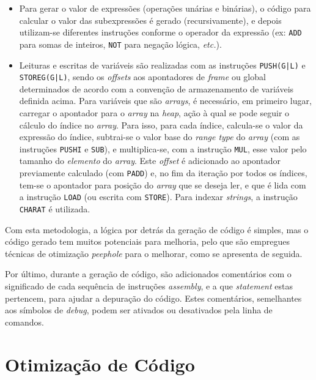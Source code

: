 \documentclass[12pt, a4paper]{article}
\begin{document}
\begin{itemize}
    \item Para gerar o valor de expressões (operações unárias e binárias), o código para calcular o
        valor das subexpressões é gerado (recursivamente), e depois utilizam-se diferentes
        instruções conforme o operador da expressão (ex: \texttt{ADD} para somas de inteiros,
        \texttt{NOT} para negação lógica, \emph{etc.}).

    \item Leituras e escritas de variáveis são realizadas com as instruções \texttt{PUSH(G|L)} e
        \texttt{STOREG(G|L)}, sendo os \emph{offsets} aos apontadores de \emph{frame} ou global
        determinados de acordo com a convenção de armazenamento de variáveis definida acima. Para
        variáveis que são \emph{arrays}, é necessário, em primeiro lugar, carregar o apontador para
        o \emph{array} na \emph{heap}, ação à qual se pode seguir o cálculo do índice no
        \emph{array}. Para isso, para cada índice, calcula-se o valor da expressão do índice,
        subtrai-se o valor base do \emph{range type} do \emph{array} (com as instruções
        \texttt{PUSHI} e \texttt{SUB}), e multiplica-se, com a instrução \texttt{MUL}, esse valor
        pelo tamanho do \emph{elemento} do \emph{array}. Este \emph{offset} é adicionado ao
        apontador previamente calculado (com \texttt{PADD}) e, no fim da iteração por todos os
        índices, tem-se  o apontador para posição do \emph{array} que se deseja ler, e que é lida
        com a instrução \texttt{LOAD} (ou escrita com \texttt{STORE}). Para indexar \emph{strings},
        a instrução \texttt{CHARAT} é utilizada.
\end{itemize}

Com esta metodologia, a lógica por detrás da geração de código é simples, mas o código gerado tem
muitos potenciais para melhoria, pelo que são empregues técnicas de otimização \emph{peephole} para
o melhorar, como se apresenta de seguida.

Por último, durante a geração de código, são adicionados comentários com o significado de cada
sequência de instruções \emph{assembly}, e a que \emph{statement} estas pertencem, para ajudar a
depuração do código. Estes comentários, semelhantes aos símbolos de \emph{debug}, podem ser ativados
ou desativados pela linha de comandos.

\section{Otimização de Código}
\end{document}
